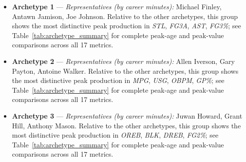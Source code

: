 \begin{itemize}
\item \textbf{Archetype 1} --- \emph{Representatives (by career minutes):} Michael Finley, Antawn Jamison, Joe Johnson. Relative to the other archetypes, this group shows the most distinctive peak production in \textit{STL}, \textit{FG3A}, \textit{AST}, \textit{FG3\%}; see Table~\ref{tab:archetype_summary} for complete peak-age and peak-value comparisons across all 17 metrics.
\item \textbf{Archetype 2} --- \emph{Representatives (by career minutes):} Allen Iverson, Gary Payton, Antoine Walker. Relative to the other archetypes, this group shows the most distinctive peak production in \textit{MPG}, \textit{USG}, \textit{OBPM}, \textit{GP\%}; see Table~\ref{tab:archetype_summary} for complete peak-age and peak-value comparisons across all 17 metrics.
\item \textbf{Archetype 3} --- \emph{Representatives (by career minutes):} Juwan Howard, Grant Hill, Anthony Mason. Relative to the other archetypes, this group shows the most distinctive peak production in \textit{OREB}, \textit{BLK}, \textit{DREB}, \textit{FG2\%}; see Table~\ref{tab:archetype_summary} for complete peak-age and peak-value comparisons across all 17 metrics.
\end{itemize}
